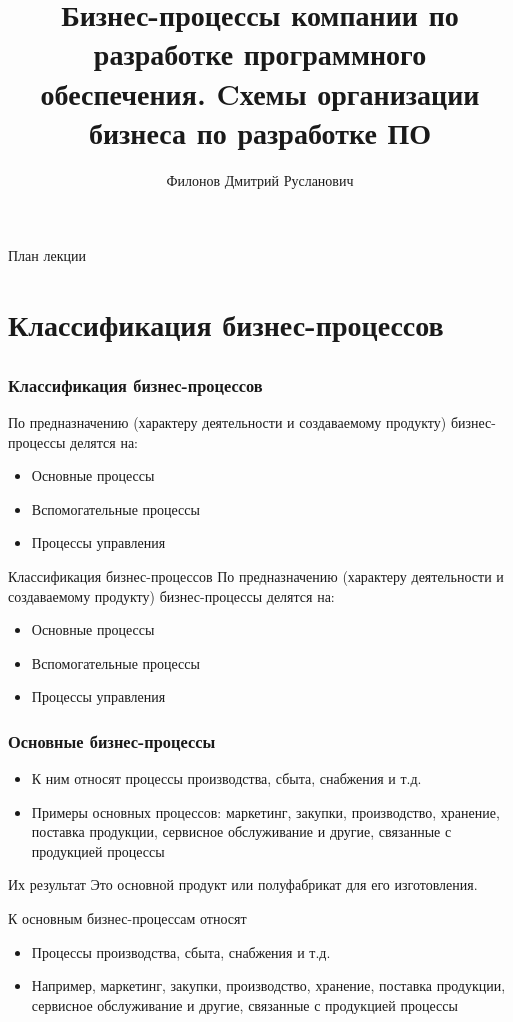 \documentclass{../industrial-development}
\title{Бизнес-процессы компании по разработке программного обеспечения. 
Cхемы организации бизнеса по разработке ПО}
\author{Филонов Дмитрий Русланович}
\date{}
\begin{document}
\begin{frame}
  \titlepage
\end{frame}

\begin{frame}{План лекции}
  \tableofcontents
\end{frame}

\section{Классификация бизнес-процессов}
\subsection{}

\begin{frame} \frametitle{Классификация бизнес-процессов}
По предназначению (характеру деятельности и создаваемому продукту) бизнес-процессы делятся на:
\begin{itemize}
	\item Основные процессы
	\item Вспомогательные процессы
	\item Процессы управления
\end{itemize}
\end{frame}
\lecturenotes
Классификация бизнес-процессов
По предназначению (характеру деятельности и создаваемому продукту) бизнес-процессы делятся на:
\begin{itemize}
	\item Основные процессы
	\item Вспомогательные процессы
	\item Процессы управления
\end{itemize}


\begin{frame} \frametitle{Основные бизнес-процессы}
\begin{itemize}
	\item К ним относят процессы производства, сбыта, снабжения и т.д.
	\item Примеры основных процессов: маркетинг, закупки, производство, хранение, поставка продукции, сервисное обслуживание и другие, связанные с продукцией процессы
\end{itemize}
\begin {block}{Их результат}
Это основной продукт или полуфабрикат для его изготовления.
\end {block}
\end{frame}
\lecturenotes
К \alert{основным} бизнес-процессам относят
\begin{itemize}
	\item Процессы производства, сбыта, снабжения и т.д.
	\item Например, маркетинг, закупки, производство, хранение, поставка продукции, сервисное обслуживание и другие, связанные с продукцией процессы
\end{itemize}
\end{document}
